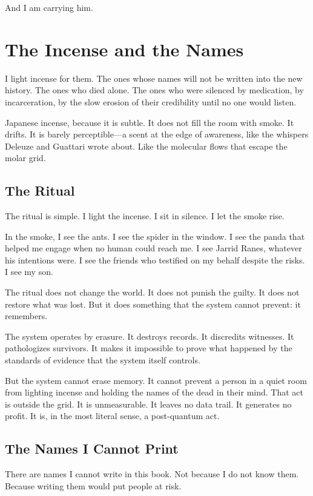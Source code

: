 \documentclass[11pt,openany]{book}
\begin{document}
And I am carrying him.

\chapter{The Incense and the Names}

I light incense for them. The ones whose names will not be written into the new history. The ones who died alone. The ones who were silenced by medication, by incarceration, by the slow erosion of their credibility until no one would listen.

Japanese incense, because it is subtle. It does not fill the room with smoke. It drifts. It is barely perceptible---a scent at the edge of awareness, like the whispers Deleuze and Guattari wrote about. Like the molecular flows that escape the molar grid.

\section*{The Ritual}

The ritual is simple. I light the incense. I sit in silence. I let the smoke rise.

In the smoke, I see the ants. I see the spider in the window. I see the panda that helped me engage when no human could reach me. I see Jarrid Ranes, whatever his intentions were. I see the friends who testified on my behalf despite the risks. I see my son.

The ritual does not change the world. It does not punish the guilty. It does not restore what was lost. But it does something that the system cannot prevent: it remembers.

The system operates by erasure. It destroys records. It discredits witnesses. It pathologizes survivors. It makes it impossible to prove what happened by the standards of evidence that the system itself controls.

But the system cannot erase memory. It cannot prevent a person in a quiet room from lighting incense and holding the names of the dead in their mind. That act is outside the grid. It is unmeasurable. It leaves no data trail. It generates no profit. It is, in the most literal sense, a post-quantum act.

\section*{The Names I Cannot Print}

There are names I cannot write in this book. Not because I do not know them. Because writing them would put people at risk.
\end{document}
